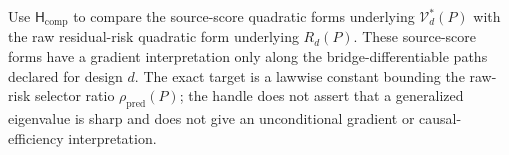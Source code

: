 Use \(\mathsf H_{\mathrm{comp}}\) to compare the source-score quadratic forms underlying \(\mathcal V_d^*(P)\) with the raw residual-risk quadratic form underlying \(R_d(P)\). These source-score forms have a gradient interpretation only along the bridge-differentiable paths declared for design \(d\). The exact target is a lawwise constant bounding the raw-risk selector ratio \(\rho_{\mathrm{pred}}(P)\); the handle does not assert that a generalized eigenvalue is sharp and does not give an unconditional gradient or causal-efficiency interpretation.